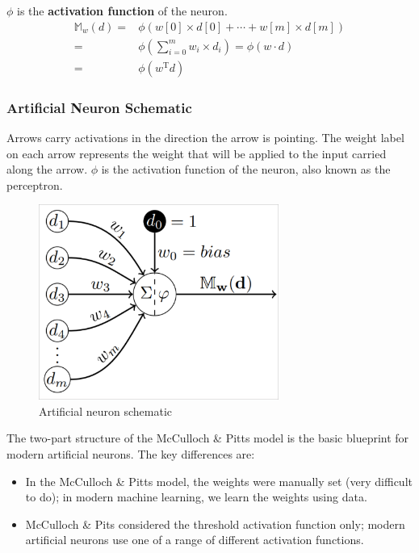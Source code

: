 \documentclass[a4paper,11pt]{article}
\begin{document}
$\phi$ is the \textbf{activation function} of the neuron.
\begin{align*}
    \mathbb{M}_w(d) =& \phi (w[0] \times d[0] + \cdots + w[m] \times d[m]) \\
    =& \phi \left( \sum^m_{i=0} w_i \times d_i \right) = \phi \left( w \cdot d \right) \\
    =& \phi \left(  w^{\text{T}}d \right)
\end{align*}

\subsubsection{Artificial Neuron Schematic}
Arrows carry activations in the direction the arrow is pointing.
The weight label on each arrow represents the weight that will be applied to the input carried along the arrow.
$\phi$ is the activation function of the neuron, also known as the perceptron.

\begin{figure}[H]
    \centering
    \includegraphics[width=0.7\textwidth]{images/schematic.png}
    \caption{ Artificial neuron schematic }
\end{figure}

The two-part structure of the McCulloch \& Pitts model is the basic blueprint for modern artificial neurons.
The key differences are:
\begin{itemize}
    \item   In the McCulloch \& Pitts model, the weights were manually set (very difficult to do);
            in modern machine learning, we learn the weights using data.
    \item   McCulloch \& Pits considered the threshold activation function only; modern artificial neurons use one of a range of different activation functions.
\end{itemize}
\end{document}
